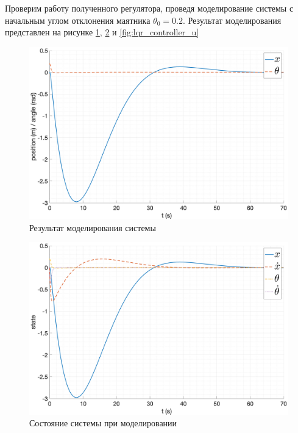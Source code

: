 Проверим работу полученного регулятора, проведя моделирование системы с начальным углом 
отклонения маятника $\theta_0 = 0.2$. Результат моделирования представлен на рисунке \ref{fig:lqr_controller}, \ref{fig:lqr_controller_state} и 
\ref{fig:lqr_controller_u} 
\begin{figure}[ht!]
    \centering
    \includegraphics[width=\textwidth]{media/plots/LQR/out_1.png}
    \caption{Результат моделирования системы}
    \label{fig:lqr_controller}
\end{figure}
\begin{figure}[ht!]
    \centering
    \includegraphics[width=\textwidth]{media/plots/LQR/state_1.png}
    \caption{Состояние системы при моделировании}
    \label{fig:lqr_controller_state}
\end{figure}
